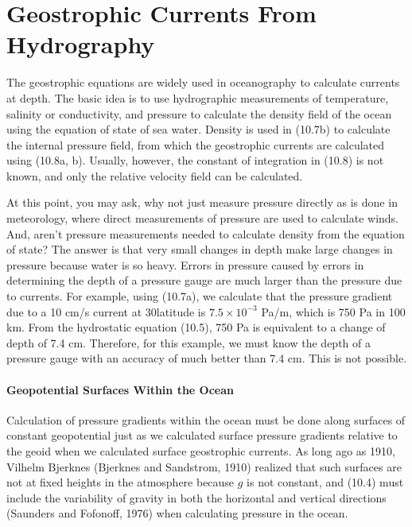 \section{Geostrophic Currents From Hydrography}
The geostrophic equations are widely used
in oceanography to calculate currents at depth. The basic idea is to use
hydrographic measurements of temperature,
salinity or conductivity, and pressure to calculate the density field of the ocean using the
equation of state of sea water. Density is used in (10.7b) to calculate the internal pressure
field, from which the geostrophic currents are calculated using (10.8a, b). Usually, however,
the constant of integration in (10.8) is not known, and only the relative velocity field can
be calculated.

At this point, you may ask, why not just measure pressure directly as is done in
meteorology, where direct measurements of pressure are used to calculate winds.
And, aren't pressure measurements needed to calculate density from the
equation of state? The answer is that very small changes in depth make large
changes in pressure because water is so heavy. Errors in pressure caused by errors in
determining the depth of a pressure gauge are much larger than the pressure due to
currents. For example, using (10.7a), we calculate that the pressure gradient due to
a 10 cm/s current at 30\degrees latitude is
$7.5 \times 10^{-3}$ Pa/m, which is 750 Pa in 100 km. From the hydrostatic
equation (10.5), 750 Pa is equivalent to a change of depth of 7.4 cm. Therefore,
for this example, we must know the depth of a pressure gauge with an
accuracy of much better than 7.4 cm. This is not possible.

\paragraph{Geopotential Surfaces Within the Ocean}
Calculation of pressure gradients within the ocean must be
done along surfaces of constant geopotential just as we calculated surface pressure
gradients relative to the geoid when we calculated surface geostrophic currents. As
long ago as 1910, Vilhelm Bjerknes (Bjerknes and Sandstrom, 1910) realized that such surfaces
are not at fixed heights in the atmosphere because $g$ is not constant, and (10.4) must
include the variability of gravity in both the horizontal and vertical directions (Saunders
and Fofonoff, 1976) when calculating pressure in the ocean.


